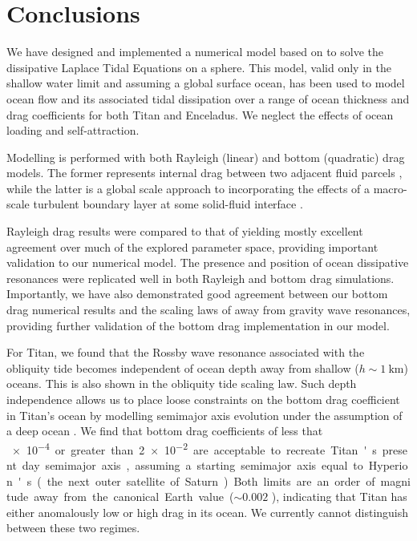 \section{Conclusions}

We have designed and implemented a numerical model based on \citet{sears1995tidal} to solve the dissipative Laplace Tidal Equations on a sphere. This model, valid only in the shallow water limit and assuming a global surface ocean, has been used to model ocean flow and its associated tidal dissipation over a range of ocean thickness and drag coefficients for both Titan and Enceladus. We neglect the effects of ocean loading and self-attraction.

Modelling is performed with both Rayleigh (linear) and bottom (quadratic) drag models. The former represents internal drag between two adjacent fluid parcels \citep{neumann1968ocean}, while the latter is a global scale approach to incorporating the effects of a macro-scale turbulent boundary layer at some solid-fluid interface \citep{gill1982atmosphere}.

Rayleigh drag results were compared to that of \citet{matsuyama2014tidal} yielding mostly excellent agreement over much of the explored parameter space, providing important validation to our numerical model. The presence and position of ocean dissipative resonances were replicated well in both Rayleigh and bottom drag simulations. Importantly, we have also demonstrated good agreement between our bottom drag numerical results and the scaling laws of \citet{chen2013tidal} away from gravity wave resonances, providing further validation of the bottom drag implementation in our model.

For Titan, we found that the Rossby wave resonance associated with the obliquity tide becomes independent of ocean depth away from shallow ($h \sim\SI{1}{\kilo\metre}$) oceans. This is also shown in the \citet{chen2013tidal} obliquity tide scaling law. Such depth independence allows us to place loose constraints on the bottom drag coefficient in Titan's ocean by modelling semimajor axis evolution under the assumption of a deep ocean \citep{sohl2014structural,baland2014titan}. We find that bottom drag coefficients of less that \SI{e-4} or greater than \SI{2e-2} are acceptable to recreate Titan's present day semimajor axis, assuming a starting semimajor axis equal to Hyperion's (the next outer satellite of Saturn). Both limits are an order of magnitude away from the canonical Earth value ($\sim 0.002$ \citep{egbert2001estimates}), indicating that Titan has either anomalously low or high drag in its ocean. We currently cannot distinguish between these two regimes. 

